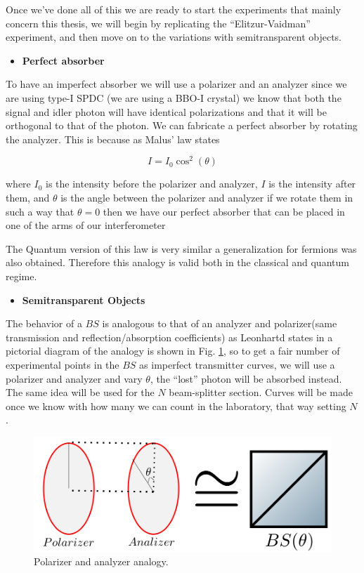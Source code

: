 \documentclass[12pt]{book}
\begin{document}
Once we've done all of this we are ready to start the experiments that mainly concern this thesis, we will begin by replicating the ``Elitzur-Vaidman'' experiment, and then move on to the variations with semitransparent objects.


\begin{itemize}
\item {\large \textbf{Perfect absorber}}
\end{itemize}
To have an imperfect absorber we will use a polarizer and an analyzer since we are using type-I SPDC (we are using a BBO-I crystal) we know that both the signal and idler photon will have identical polarizations and that it will be orthogonal to that of the photon. We can fabricate a perfect absorber by rotating the analyzer. This is because as Malus' law states \cite{hecht}

\begin{equation}
I=I_{0} \cos^{2}(\theta)
\end{equation}

where $I_{0}$ is the intensity before the polarizer and analyzer, $I$ is the intensity after them, and $\theta$ is the angle between the polarizer and analyzer if we rotate them in such a way that $\theta=0$ then we have our perfect absorber that can be placed in one of the arms of our interferometer


The Quantum version of this law is very similar \cite{malus} a generalization for fermions was also obtained. Therefore this analogy is valid both in the classical and quantum regime.
 \begin{itemize}
\item {\large \textbf{Semitransparent Objects}}
\end{itemize}

The behavior of a $BS$ is analogous to that of an analyzer and polarizer(same transmission and reflection/absorption coefficients) as Leonhartd states in \cite{Leonhardt_2003} a pictorial diagram of the analogy is shown in Fig. \ref{BS and polarizer}, so to get a fair number of experimental points in the $BS$ as imperfect transmitter curves, we will use a polarizer and analyzer and vary $\theta$, the ``lost'' photon will be absorbed instead. The same idea will be used for the $N$ beam-splitter section. Curves will be made once we know with how many we can count in the laboratory, that way setting $N$.

\begin{figure}[H]
\centering
\includegraphics[scale=0.3]{images/polarizeranalogy.png}
\caption{Polarizer and analyzer analogy.}
\label{BS and polarizer}
\end{figure}
\end{document}
